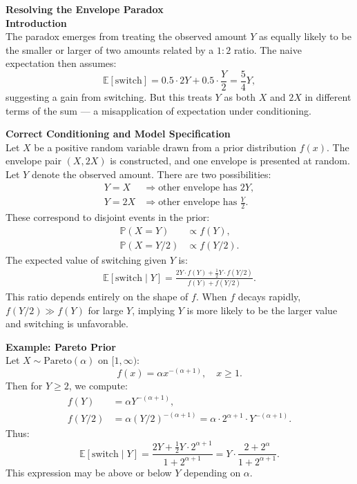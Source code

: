 \begin{technical}
{\Large\textbf{Resolving the Envelope Paradox}}\\[0.7em]

\textbf{Introduction}\\[0.5em]
The paradox emerges from treating the observed amount $Y$ as equally likely to be the smaller or larger of two amounts related by a $1:2$ ratio. The naive expectation then assumes:
\[
\mathbb{E}[\text{switch}] = 0.5 \cdot 2Y + 0.5 \cdot \frac{Y}{2} = \frac{5}{4}Y,
\]
suggesting a gain from switching. But this treats $Y$ as both $X$ and $2X$ in different terms of the sum — a misapplication of expectation under conditioning.

\textbf{Correct Conditioning and Model Specification}\\[0.5em]
Let $X$ be a positive random variable drawn from a prior distribution $f(x)$. The envelope pair $(X, 2X)$ is constructed, and one envelope is presented at random. Let $Y$ denote the observed amount. There are two possibilities:
\begin{align}
Y = X &\Rightarrow \text{other envelope has } 2Y,\\
Y = 2X &\Rightarrow \text{other envelope has } \frac{Y}{2}.
\end{align}
These correspond to disjoint events in the prior:
\begin{align}
\mathbb{P}(X = Y) &\propto f(Y), \\
\mathbb{P}(X = Y/2) &\propto f(Y/2).
\end{align}
The expected value of switching given $Y$ is:
\begin{align}
\mathbb{E}[\text{switch} \mid Y] 
= \frac{2Y \cdot f(Y) + \tfrac{1}{2}Y \cdot f(Y/2)}{f(Y) + f(Y/2)}.
\end{align}
This ratio depends entirely on the shape of $f$. When $f$ decays rapidly, $f(Y/2) \gg f(Y)$ for large $Y$, implying $Y$ is more likely to be the larger value and switching is unfavorable.

\textbf{Example: Pareto Prior}\\[0.5em]
Let $X \sim \text{Pareto}(\alpha)$ on $[1, \infty)$:
\[
f(x) = \alpha x^{-(\alpha + 1)}, \quad x \ge 1.
\]
Then for $Y \ge 2$, we compute:
\begin{align}
f(Y) &= \alpha Y^{-(\alpha + 1)}, \\
f(Y/2) &= \alpha (Y/2)^{-(\alpha + 1)} = \alpha \cdot 2^{\alpha + 1} \cdot Y^{-(\alpha + 1)}.
\end{align}
Thus:
\[
\mathbb{E}[\text{switch} \mid Y] = \frac{2Y + \tfrac{1}{2}Y \cdot 2^{\alpha + 1}}{1 + 2^{\alpha + 1}} = Y \cdot \frac{2 + 2^{\alpha}}{1 + 2^{\alpha + 1}}.
\]
This expression may be above or below $Y$ depending on $\alpha$.


\end{technical}
